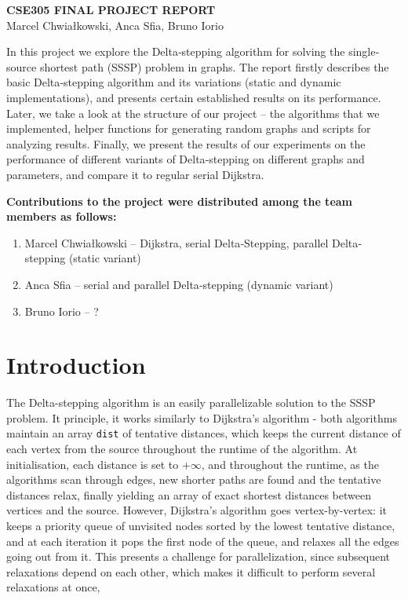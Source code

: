 \documentclass[12pt]{article}
\begin{document}
\begin{center}
  {\LARGE\bfseries CSE305 FINAL PROJECT REPORT}\\[1.5em]
  {\large Marcel Chwiałkowski, \; Anca Sfia, \; Bruno Iorio}
\end{center}

\vspace{2em}


In this project we explore the Delta‐stepping algorithm for solving the single‐source shortest path (SSSP) problem in graphs. The report firstly describes the basic Delta‐stepping algorithm and its variations (static and dynamic implementations), and presents certain established results on its performance. Later, we take a look at the structure of our project – the algorithms that we implemented, helper functions for generating random graphs and scripts for analyzing results. Finally, we present the results of our experiments on the performance of different variants of Delta‐stepping on different graphs and parameters, and compare it to regular serial Dijkstra.

\vspace{1em}

\textbf{Contributions to the project were distributed among the team members as follows:}
\begin{enumerate}
  \item Marcel Chwiałkowski – Dijkstra, serial Delta‐Stepping, parallel Delta‐stepping (static variant)
  \item Anca Sfia – serial and parallel Delta‐stepping (dynamic variant)
  \item Bruno Iorio – ? 
\end{enumerate}

\vspace{2em}
\section{Introduction}

The Delta-stepping algorithm is an easily parallelizable solution to the SSSP problem. It principle, it works similarly to Dijkstra’s algorithm - both algorithms maintain an array \texttt{dist} of tentative distances, which keeps the current distance of each vertex from the source throughout the runtime of the algorithm. At initialisation, each distance is set to $+\infty$, and throughout the runtime, as the algorithms scan through edges, new shorter paths are found and the tentative distances relax, finally yielding an array of exact shortest distances between vertices and the source. However, Dijkstra’s algorithm goes vertex-by-vertex: it keeps a priority queue of unvisited nodes sorted by the lowest tentative distance, and at each iteration it pops the first node of the queue, and relaxes all the edges going out from it. This presents a challenge for parallelization, since subsequent relaxations depend on each other, which makes it difficult to perform several relaxations at once, 
\end{document}
